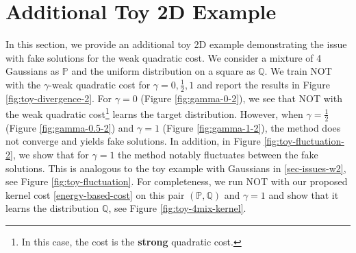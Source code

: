 \documentclass{article} %
\begin{document}
\clearpage
\section{Additional Toy 2D Example}
\label{sec-toy-example-fake-extra}

In this section, we provide an additional toy 2D example demonstrating the issue with fake solutions for the weak quadratic cost. We consider a mixture of 4 Gaussians as $\mathbb{P}$ and the uniform distribution on a square as $\mathbb{Q}$. We train NOT with the $\gamma$-weak quadratic cost for $\gamma=0,\frac{1}{2},1$ and report the results in Figure \ref{fig:toy-divergence-2}. For $\gamma=0$ (Figure \ref{fig:gamma-0-2}), we see that NOT with the weak quadratic cost\footnote{In this case, the cost is the \textbf{strong} quadratic cost.} learns the target distribution. However, when $\gamma=\frac{1}{2}$ (Figure \ref{fig:gamma-0.5-2}) and $\gamma=1$ (Figure \ref{fig:gamma-1-2}), the method does not converge and yields fake solutions. In addition, in Figure \ref{fig:toy-fluctuation-2}, we show that for $\gamma=1$ the method notably fluctuates between the fake solutions. This is analogous to the toy example with Gaussians in \wasyparagraph\ref{sec-issues-w2}, see Figure \ref{fig:toy-fluctuation}. For completeness, we run NOT with our proposed kernel cost \eqref{energy-based-cost} on this pair $(\mathbb{P},\mathbb{Q})$ and $\gamma=1$ and show that it learns the distribution $\mathbb{Q}$, see Figure \ref{fig:toy-4mix-kernel}.
\end{document}
